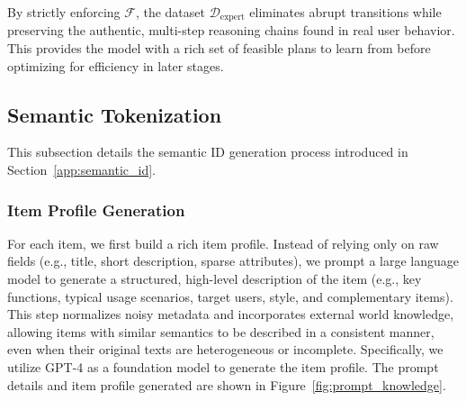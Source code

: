 \documentclass{llmxive}
\makeatletter
\providecommand{\algorithmiccomment}[1]{\#\ #1}
\providecommand{\STATE}{\ALC@it}
\providecommand{\COMMENT}[1]{\algorithmiccomment{##1}}
\providecommand{\IF}[2][default]{\ALC@it\algorithmicif\ ##2\ \algorithmicthen\ALC@com{##1}\begin{ALC@if}}
\providecommand{\FOR}[2][default]{\ALC@it\algorithmicfor\ ##2\ \algorithmicdo\ALC@com{##1}\begin{ALC@for}}
\providecommand{\ENDIF}{\end{ALC@if}}
\providecommand{\ENDFOR}{\end{ALC@for}}
\makeatother
\begin{document}
\begin{algorithm}[tb]
   \caption{Goal-oriented Trajectory Mining}
   \label{alg:mining}
\end{algorithm}

By strictly enforcing $\mathcal{F}$, the dataset $\mathcal{D}_{\text{expert}}$ eliminates abrupt transitions while preserving the authentic, multi-step reasoning chains found in real user behavior. This provides the model with a rich set of feasible plans to learn from before optimizing for efficiency in later stages.

\subsection{Semantic Tokenization}
\label{app:semantic}

This subsection details the semantic ID generation process introduced in Section~\ref{app:semantic_id}.

\subsubsection{Item Profile Generation}

For each item, we first build a rich item profile. Instead of relying only on raw fields (e.g., title, short description, sparse attributes), we prompt a large language model to generate a structured, high-level description of the item (e.g., key functions, typical usage scenarios, target users, style, and complementary items). This step normalizes noisy metadata and incorporates external world knowledge, allowing items with similar semantics to be described in a consistent manner, even when their original texts are heterogeneous or incomplete. Specifically, we utilize GPT-4 as a foundation model to generate the item profile. The prompt details and item profile generated are shown in Figure~\ref{fig:prompt_knowledge}.
\end{document}
